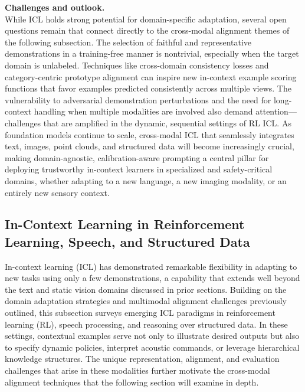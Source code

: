\documentclass[11pt]{article}
\begin{document}
\textbf{Challenges and outlook.}\\
While ICL holds strong potential for domain-specific adaptation, several open questions remain that connect directly to the cross-modal alignment themes of the following subsection. The selection of faithful and representative demonstrations in a training-free manner is nontrivial, especially when the target domain is unlabeled. Techniques like cross-domain consistency losses \cite{ref145} and category-centric prototype alignment \cite{ref146} can inspire new in-context example scoring functions that favor examples predicted consistently across multiple views. The vulnerability to adversarial demonstration perturbations and the need for long-context handling when multiple modalities are involved also demand attention---challenges that are amplified in the dynamic, sequential settings of RL ICL. As foundation models continue to scale, cross-modal ICL that seamlessly integrates text, images, point clouds, and structured data will become increasingly crucial, making domain-agnostic, calibration-aware prompting a central pillar for deploying trustworthy in-context learners in specialized and safety-critical domains, whether adapting to a new language, a new imaging modality, or an entirely new sensory context.

\subsection{In-Context Learning in Reinforcement Learning, Speech, and Structured Data}

In-context learning (ICL) has demonstrated remarkable flexibility in adapting to new tasks using only a few demonstrations, a capability that extends well beyond the text and static vision domains discussed in prior sections. Building on the domain adaptation strategies and multimodal alignment challenges previously outlined, this subsection surveys emerging ICL paradigms in reinforcement learning (RL), speech processing, and reasoning over structured data. In these settings, contextual examples serve not only to illustrate desired outputs but also to specify dynamic policies, interpret acoustic commands, or leverage hierarchical knowledge structures. The unique representation, alignment, and evaluation challenges that arise in these modalities further motivate the cross-modal alignment techniques that the following section will examine in depth.
\end{document}
